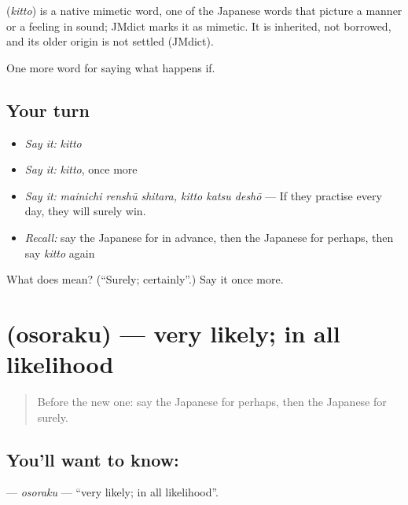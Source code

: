 \begin{cousinweb}
\textbf{} (\emph{kitto}) is a native mimetic word, one of the Japanese words that picture a manner or a feeling in sound; JMdict marks it as mimetic. It is inherited, not borrowed, and its older origin is not settled (JMdict).
\end{cousinweb}

\begin{grammarlens}[title={What you've built}]
One more word for saying what happens if.
\end{grammarlens}

\subsection*{Your turn}
\begin{itemize}
\raggedright
  \item \emph{Say it:} \emph{kitto}
  \item \emph{Say it:} \emph{kitto}, once more
  \item \emph{Say it:} \emph{mainichi renshū shitara, kitto katsu deshō} — If they practise every day, they will surely win.
  \item \emph{Recall:} say the Japanese for in advance, then the Japanese for perhaps, then say \emph{kitto} again
\end{itemize}

\begin{tcolorbox}[breakable,colback=teal!4,colframe=teal!35!black,title={Before you move on}]
What does  mean? (\textquotedblleft{}Surely; certainly\textquotedblright{}.) Say it once more.
\end{tcolorbox}
\section[\texorpdfstring{\ja{おそらく} (osoraku)}{おそらく (osoraku)}]{ (osoraku) — very likely; in all likelihood}

\label{lesson:JA-C355-osoraku}



\begin{quote}
Before the new one: say the Japanese for perhaps, then the Japanese for surely.
\end{quote}

\subsection*{You'll want to know: }
\textbf{} — \emph{osoraku} — \textquotedblleft{}very likely; in all likelihood\textquotedblright{}.

